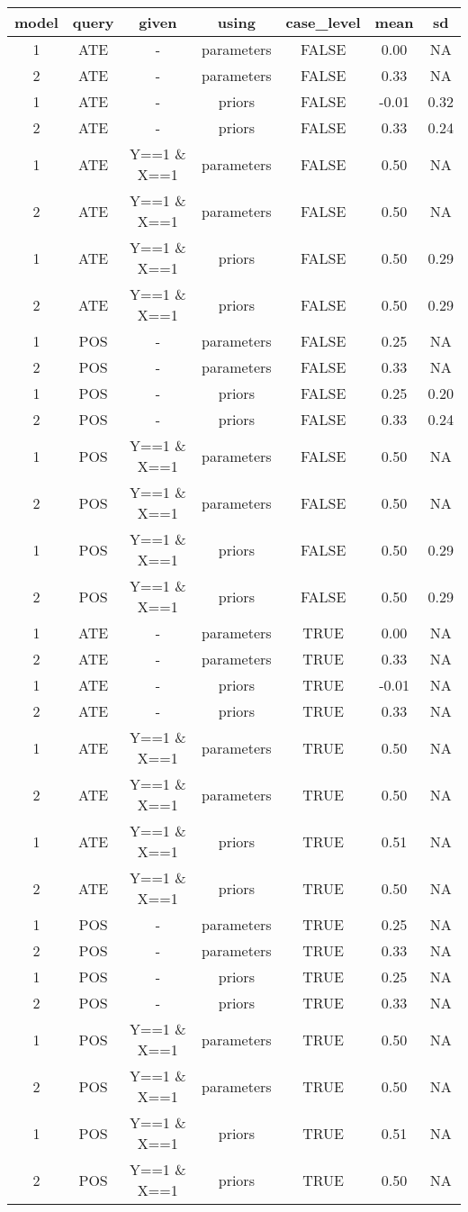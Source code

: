 \documentclass[
  11pt,
  article]{jss}
\begin{document}
\begin{longtable}{ccccccc}
\toprule
model & query & given & using & case\_level & mean & sd\\
\midrule
1 & ATE & - & parameters & FALSE & 0.00 & NA\\
2 & ATE & - & parameters & FALSE & 0.33 & NA\\
1 & ATE & - & priors & FALSE & -0.01 & 0.32\\
2 & ATE & - & priors & FALSE & 0.33 & 0.24\\
1 & ATE & Y==1 \& X==1 & parameters & FALSE & 0.50 & NA\\
2 & ATE & Y==1 \& X==1 & parameters & FALSE & 0.50 & NA\\
1 & ATE & Y==1 \& X==1 & priors & FALSE & 0.50 & 0.29\\
2 & ATE & Y==1 \& X==1 & priors & FALSE & 0.50 & 0.29\\
1 & POS & - & parameters & FALSE & 0.25 & NA\\
2 & POS & - & parameters & FALSE & 0.33 & NA\\
1 & POS & - & priors & FALSE & 0.25 & 0.20\\
2 & POS & - & priors & FALSE & 0.33 & 0.24\\
1 & POS & Y==1 \& X==1 & parameters & FALSE & 0.50 & NA\\
2 & POS & Y==1 \& X==1 & parameters & FALSE & 0.50 & NA\\
1 & POS & Y==1 \& X==1 & priors & FALSE & 0.50 & 0.29\\
2 & POS & Y==1 \& X==1 & priors & FALSE & 0.50 & 0.29\\
1 & ATE & - & parameters & TRUE & 0.00 & NA\\
2 & ATE & - & parameters & TRUE & 0.33 & NA\\
1 & ATE & - & priors & TRUE & -0.01 & NA\\
2 & ATE & - & priors & TRUE & 0.33 & NA\\
1 & ATE & Y==1 \& X==1 & parameters & TRUE & 0.50 & NA\\
2 & ATE & Y==1 \& X==1 & parameters & TRUE & 0.50 & NA\\
1 & ATE & Y==1 \& X==1 & priors & TRUE & 0.51 & NA\\
2 & ATE & Y==1 \& X==1 & priors & TRUE & 0.50 & NA\\
1 & POS & - & parameters & TRUE & 0.25 & NA\\
2 & POS & - & parameters & TRUE & 0.33 & NA\\
1 & POS & - & priors & TRUE & 0.25 & NA\\
2 & POS & - & priors & TRUE & 0.33 & NA\\
1 & POS & Y==1 \& X==1 & parameters & TRUE & 0.50 & NA\\
2 & POS & Y==1 \& X==1 & parameters & TRUE & 0.50 & NA\\
1 & POS & Y==1 \& X==1 & priors & TRUE & 0.51 & NA\\
2 & POS & Y==1 \& X==1 & priors & TRUE & 0.50 & NA\\
\bottomrule
\end{longtable}
\end{document}
